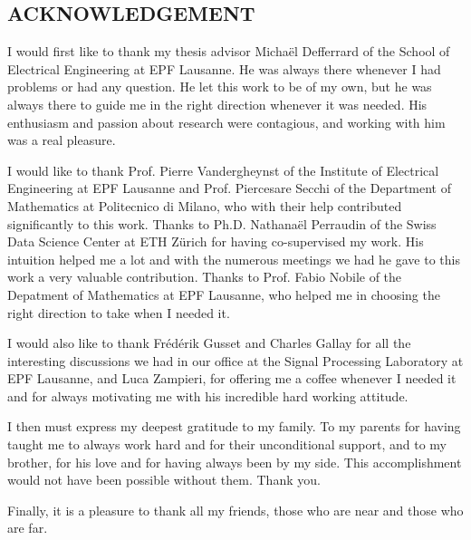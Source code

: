 \documentclass[12pt,titlepage]{article}
\theoremstyle{plain}
\theoremstyle{remark}
\begin{document}
\pagebreak

\begin{center}
	\subsection*{ACKNOWLEDGEMENT}
\end{center}
I would first like to thank my thesis advisor Micha\"el Defferrard of the School of Electrical Engineering at EPF Lausanne. He was always there whenever I had problems or had any question. He let this work to be of my own, but he was always there to guide me in the right direction whenever it was needed. His enthusiasm and passion about research were contagious, and working with him was a real pleasure.

I would like to thank Prof. Pierre Vandergheynst of the Institute of Electrical Engineering at EPF Lausanne and Prof. Piercesare Secchi of the Department of Mathematics at Politecnico di Milano, who with their help contributed significantly to this work. Thanks to Ph.D. Nathana\"el Perraudin of the Swiss Data Science Center at ETH Z\"urich for having co-supervised my work. His intuition helped me a lot and with the numerous meetings we had he gave to this work a very valuable contribution. Thanks to Prof. Fabio Nobile of the Depatment of Mathematics at EPF Lausanne, who helped me in choosing the right direction to take when I needed it.

I would also like to thank Fr\'ed\'erik Gusset and Charles Gallay for all the interesting discussions we had in our office at the Signal Processing Laboratory at EPF Lausanne, and Luca Zampieri, for offering me a coffee whenever I needed it and for always motivating me with his incredible hard working attitude.

I then must express my deepest gratitude to my family. To my parents for having taught me to always work hard and for their unconditional support, and to my brother, for his love and for having always been by my side. This accomplishment would not have been possible without them. Thank you.

Finally, it is a pleasure to thank all my friends, those who are near and those who are far. 
\pagebreak

\tableofcontents

\pagebreak



\pagebreak



\pagebreak



\pagebreak



\pagebreak




\pagebreak
{\small } 
\nocite{*}
\pagebreak




\pagebreak
\end{document}
